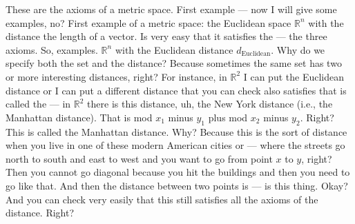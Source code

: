 \begin{spoken-clean}[00:15:15 - 00:17:15]
These are the axioms of a metric space. First example --- now I will give some examples, no? First example of a metric space: the Euclidean space $\mathbb{R}^n$ with the distance the length of a vector. Is very easy that it satisfies the --- the three axioms. So, examples. $\mathbb{R}^n$ with the Euclidean distance $d_{\text{Euclidean}}$. Why do we specify both the set and the distance? Because sometimes the same set has two or more interesting distances, right? For instance, in $\mathbb{R}^2$ I can put the Euclidean distance or I can put a different distance that you can check also satisfies that is called the --- in $\mathbb{R}^2$ there is this distance, uh, the New York distance (i.e., the Manhattan distance). That is mod $x_1$ minus $y_1$ plus mod $x_2$ minus $y_2$. Right? This is called the Manhattan distance. Why? Because this is the sort of distance when you live in one of these modern American cities or --- where the streets go north to south and east to west and you want to go from point $x$ to $y$, right? Then you cannot go diagonal because you hit the buildings and then you need to go like that. And then the distance between two points is --- is this thing. Okay? And you can check very easily that this still satisfies all the axioms of the distance. Right?
\end{spoken-clean}

